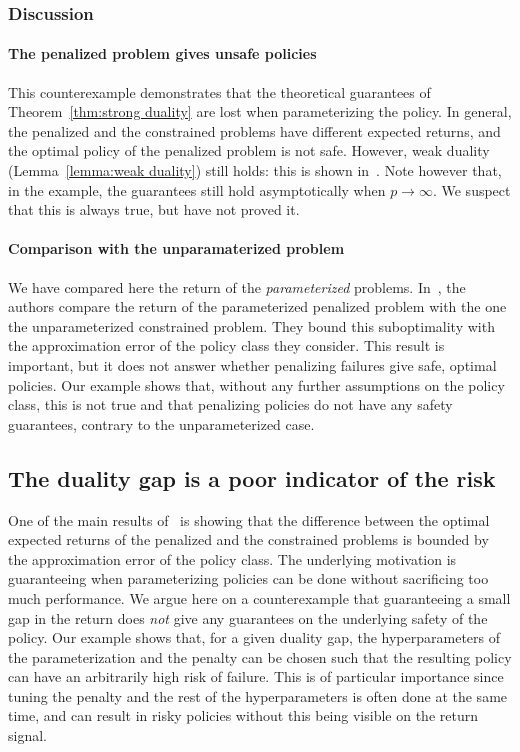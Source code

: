 \subsubsection{Discussion} 
\paragraph{The penalized problem gives unsafe policies} This counterexample demonstrates that the theoretical guarantees of Theorem~\ref{thm:strong duality} are lost when parameterizing the policy. In general, the penalized and the constrained problems have different expected returns, and the optimal policy of the penalized problem is not safe. However, weak duality (Lemma~\ref{lemma:weak duality}) still holds: this is shown in~\cite{paternain2019safe}. Note however that, in the example, the guarantees still hold asymptotically when $p\to\infty$. We suspect that this is always true, but have not proved it.

\paragraph{Comparison with the unparamaterized problem} We have compared here the return of the\emph{ parameterized} problems. In~\cite{paternain2019safe}, the authors compare the return of the parameterized penalized problem with the one the unparameterized constrained problem. They bound this suboptimality with the approximation error of the policy class they consider. This result is important, but it does not answer whether penalizing failures give safe, optimal policies. Our example shows that, without any further assumptions on the policy class, this is not true and that penalizing policies do not have any safety guarantees, contrary to the unparameterized case.

\subsection{The duality gap is a poor indicator of the risk} \label{sec:value unreliable}
One of the main results of~\cite{paternain2019safe} is showing that the difference between the optimal expected returns of the penalized and the constrained problems is bounded by the approximation error of the policy class. The underlying motivation is guaranteeing when parameterizing policies can be done without sacrificing too much performance. We argue here on a counterexample that guaranteeing a small gap in the return does\emph{ not} give any guarantees on the underlying safety of the policy. Our example shows that, for a given duality gap, the hyperparameters of the parameterization and the penalty can be chosen such that the resulting policy can have an arbitrarily high risk of failure. This is of particular importance since tuning the penalty and the rest of the hyperparameters is often done at the same time, and can result in risky policies without this being visible on the return signal.


